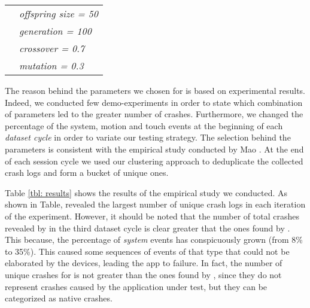 \begin{table}[tb]
\begin{tabular}{l|l|}
                                                                              & \textit{offspring size = 50}                                                     \\ \cline{2-2} 
                                                                              & \textit{generation = 100}                                               \\ \cline{2-2} 
                                                                              & \textit{crossover = 0.7}                                                \\ \cline{2-2} 
                                                                              & \textit{mutation = 0.3}                                                 \\ \cline{2-2} 
\end{tabular}
\end{table}
	
The reason behind the parameters we chosen for \monkey is based on experimental results. Indeed, we conducted few demo-experiments in order to state which combination of parameters led to the greater number of crashes. 
Furthermore, we changed the percentage of the system, motion and touch events at the beginning of each \textit{dataset cycle} in order to variate our testing strategy. 
The selection behind the \sapienz parameters is consistent with the empirical study conducted by Mao \etal \cite{sapienz}.  
At the end of each {session cycle} we used our clustering approach to deduplicate the collected crash logs and form a bucket of unique ones. 


Table \ref{tbl: results} shows the results of the empirical study we conducted. 
As shown in Table, \sapienz revealed the largest number of unique crash logs in each iteration of the experiment. 
However, it should be noted that the number of total crashes revealed by \monkey in the third dataset cycle is clear greater that the ones found by \sapienz. 
This because, the percentage of \textit{system} events has conspicuously grown (from 8\% to 35\%). This caused some sequences of events of that type that could not be elaborated by the devices, leading the app to failure. 
In fact, the number of unique crashes for \monkey is not greater than the ones found by \sapienz, since they do not represent crashes caused by the application under test, but they can be categorized as native crashes. 

